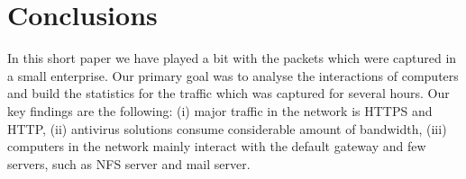 \section{Conclusions}
\label{section:conclusion}

In this short paper we have played a bit with the packets which were captured in a small enterprise. Our primary goal was to analyse the
interactions of computers and build the statistics for the traffic which was captured for several hours. Our key findings are 
the following: (i) major traffic in the network is HTTPS and HTTP, (ii) antivirus solutions consume considerable amount of 
bandwidth, (iii) computers in the network mainly interact with the default gateway and few servers, such as NFS server and mail server.

